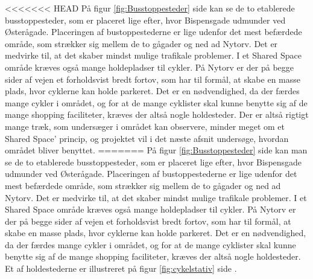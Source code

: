 <<<<<<< HEAD
På figur \cref{fig:Busstoppesteder} side \pageref{fig:Busstoppesteder} kan se de to etablerede busstoppesteder, som er placeret lige efter, hvor Bispensgade udmunder ved Østerågade. Placeringen af bustoppestederne er lige udenfor det mest befærdede område, som strækker sig mellem de to gågader og ned ad Nytorv. Det er medvirke til, at det skaber mindst mulige trafikale problemer.
I et Shared Space område kræves også mange holdepladser til cykler. På Nytorv er der på begge sider af vejen et forholdsvist bredt fortov, som har til formål, at skabe en masse plads, hvor cyklerne kan holde parkeret. Det er en nødvendighed, da der færdes mange cykler i området, og for at de mange cyklister skal kunne benytte sig af de mange shopping faciliteter, kræves der altså nogle holdesteder.
Der er altså rigtigt mange træk, som undersæger i området kan observere, minder meget om et Shared Space’ princip, og projektet vil i det næste afsnit undersøge, hvordan området bliver benyttet.
=======
På figur \cref{fig:Busstoppesteder} side \pageref{fig:Busstoppesteder} kan man se de to etablerede busstoppesteder, som er placeret lige efter, hvor Bispensgade udmunder ved Østerågade. Placeringen af bustoppestederne er lige udenfor det mest befærdede område, som strækker sig mellem de to gågader og ned ad Nytorv. Det er medvirke til, at det skaber mindst mulige trafikale problemer.
I et Shared Space område kræves også mange holdepladser til cykler. På Nytorv er der på begge sider af vejen et forholdsvist bredt fortov, som har til formål, at skabe en masse plads, hvor cyklerne kan holde parkeret. Det er en nødvendighed, da der færdes mange cykler i området, og for at de mange cyklister skal kunne benytte sig af de mange shopping faciliteter, kræves der altså nogle holdesteder. Et af holdestederne er illustreret på figur \cref{fig:cykelstativ} side \pageref{fig:cykelstativ}.
